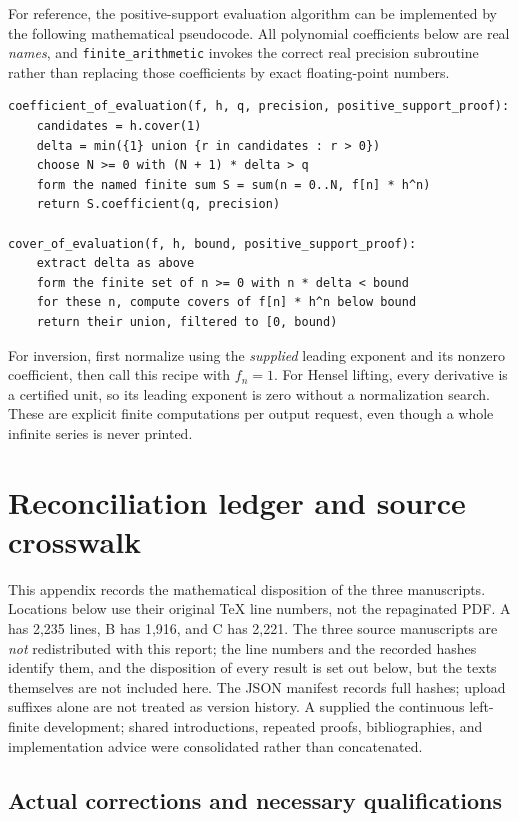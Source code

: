 \documentclass[11pt,letterpaper]{article}
\numberwithin{equation}{section}
\theoremstyle{definition}
\theoremstyle{remark}
\begin{document}
For reference, the positive-support evaluation algorithm can be implemented
by the following mathematical pseudocode. All polynomial coefficients
below are real \emph{names}, and \texttt{finite\_arithmetic} invokes the
correct real precision subroutine rather than replacing those coefficients
by exact floating-point numbers.
\begin{lstlisting}
coefficient_of_evaluation(f, h, q, precision, positive_support_proof):
    candidates = h.cover(1)
    delta = min({1} union {r in candidates : r > 0})
    choose N >= 0 with (N + 1) * delta > q
    form the named finite sum S = sum(n = 0..N, f[n] * h^n)
    return S.coefficient(q, precision)

cover_of_evaluation(f, h, bound, positive_support_proof):
    extract delta as above
    form the finite set of n >= 0 with n * delta < bound
    for these n, compute covers of f[n] * h^n below bound
    return their union, filtered to [0, bound)
\end{lstlisting}

For inversion, first normalize using the \emph{supplied} leading exponent
and its nonzero coefficient, then call this recipe with $f_n=1$. For Hensel
lifting, every derivative is a certified unit, so its leading exponent is
zero without a normalization search. These are explicit finite
computations per output request, even though a whole infinite series is
never printed.


\clearpage
\section{Reconciliation ledger and source crosswalk}
\label{app:reconcile}
This appendix records the mathematical disposition of the three manuscripts.
Locations below use their original TeX line numbers, not the repaginated PDF.
A has 2,235 lines, B has 1,916, and C has 2,221.  The three source manuscripts
are \emph{not} redistributed with this report; the line numbers and the
recorded hashes identify them, and the disposition of every result is set out
below, but the texts themselves are not included here.
The JSON manifest records full hashes; upload suffixes alone are not treated
as version history. A supplied the continuous left-finite development; shared
introductions, repeated proofs, bibliographies, and implementation advice were
consolidated rather than concatenated.

\subsection{Actual corrections and necessary qualifications}
\end{document}
